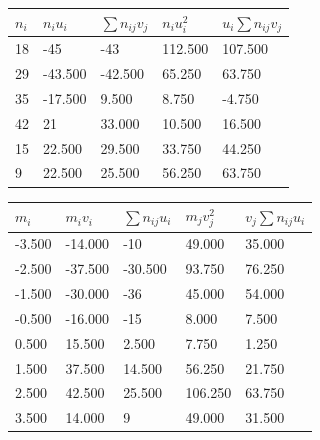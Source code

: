 \begin{table}[H]
    \begin{center}
        \begin{tabular}{|l|l|l|l|l|}
            \hline
            $n_{i}$ & $n_i u_i$ & $\sum n_{ij}v_j$ & $n_i u_i^2$ & $u_i \sum n_{ij} v_j$ \\
            \hline
            18      & -45       & -43              & 112.500     & 107.500               \\
            \hline
            29      & -43.500   & -42.500          & 65.250      & 63.750                \\
            \hline
            35      & -17.500   & 9.500            & 8.750       & -4.750                \\
            \hline
            42      & 21        & 33.000           & 10.500      & 16.500                \\
            \hline
            15      & 22.500    & 29.500           & 33.750      & 44.250                \\
            \hline
            9       & 22.500    & 25.500           & 56.250      & 63.750                \\
            \hline
        \end{tabular}
    \end{center}
\end{table}

\begin{table}[H]
    \begin{center}
        \begin{tabular}{|l|l|l|l|l|}
            \hline
            $m_{i}$ & $m_{i}v_{i}$ & $\sum n_{ij}u_{i}$ & $m_{j}v_{j}^2$ & $v_{j}\sum n_{ij}u_i$ \\\hline
            -3.500  & -14.000      & -10                & 49.000         & 35.000                \\\hline
            -2.500  & -37.500      & -30.500            & 93.750         & 76.250                \\\hline
            -1.500  & -30.000      & -36                & 45.000         & 54.000                \\\hline
            -0.500  & -16.000      & -15                & 8.000          & 7.500                 \\\hline
            0.500   & 15.500       & 2.500              & 7.750          & 1.250                 \\\hline
            1.500   & 37.500       & 14.500             & 56.250         & 21.750                \\\hline
            2.500   & 42.500       & 25.500             & 106.250        & 63.750                \\\hline
            3.500   & 14.000       & 9                  & 49.000         & 31.500                \\\hline
        \end{tabular}
    \end{center}
\end{table}

